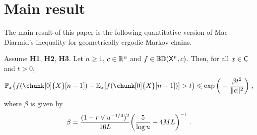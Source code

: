 \documentclass[leqno,11pt,a4paper]{article}
\begin{document}
\section{Main result}\label{sec:Main}
The main result of this paper  is the following quantitative version of Mac Diarmid's inequality for geometrically ergodic Markov chains.
\begin{theorem}\label{thm:ConcMarkQuant}
 Assume {\bf H1}, {\bf H2}, {\bf H3}. Let $n\geqslant 1$, $c\in \mathbb{R}^n$ and  $f\in \mathbb{BD}(\mathsf{X}^n,c)$. Then, for all $x\in \mathsf{C}$ and $t > 0$,
 \[
\Pbb_x\big(f( \chunk[0]{X}[n-1])-\Ebb_x[f(\chunk[0]{X}[n-1])]>t\big)\leqslant \exp\bigg(-\frac{\beta t^2}{\|c\|^2}\bigg)\eqsp,
 \]
where $\beta$ is given by
 \[
 \beta=\frac{(1-r\vee u^{-1/4})^2}{16L}\bigg(\frac5{\log u}+4ML\bigg)^{-1}\;.
 \]
\end{theorem}
\end{document}

